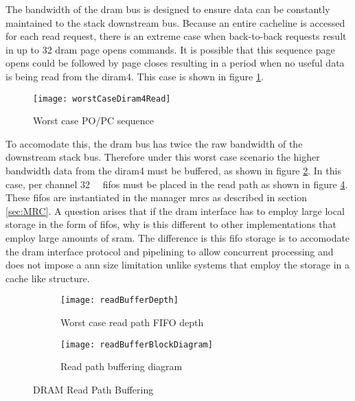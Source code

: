 The bandwidth of the \ac{dram} bus is designed to ensure data can be constantly maintained to the stack downstream bus.
Because an entire cacheline is accessed for each read request, there is an extreme case when back-to-back requests result in up to 32 \ac{dram} page opens commands.
It is possible that this sequence page opens could be followed by page closes resulting in a period when no useful data is being read from the \ac{diram4}.
This case is shown in figure \ref{fig:Worst case PO/PC sequence}.
\begin{figure}[!t]
\centering
\captionsetup{justification=centering}
\captionsetup{width=.9\linewidth}
\centerline{
\mbox{\texttt{[image: worstCaseDiram4Read]}}
}
\caption{Worst case PO/PC sequence}
\label{fig:Worst case PO/PC sequence}
\end{figure}
To accomodate this, the \ac{dram} bus has twice the raw bandwidth of the downstream stack bus. 
Therefore under this worst case scenario the higher bandwidth data from the \ac{diram4} must be buffered, as shown in figure \ref{fig:Worst case read path FIFO depth}.
In this case, per channel \SI[per-mode=symbol]{32}{\kilo\bit} \acp{fifo} must be placed in the read path as shown in figure \ref{fig:DRAM Read Path Buffering}.
These \acp{fifo} are instantiated in the manager \acp{mrc} as described in section \ref{sec:MRC}.
A question arises that if the \ac{dram} interface has to employ large local storage in the form of \acp{fifo}, why is this different to other implementations that employ large amounts of \ac{sram}.
The difference is this \ac{fifo} storage is to accomodate the \ac{dram} interface protocol and  pipelining to allow concurrent processing and does not impose a \ac{ann} size limitation unlike systems that employ the storage in a cache like structure.


\begin{figure}
\centering
\begin{subfigure}{.9\textwidth}
  \centering
  \texttt{[image: readBufferDepth]}
  \captionsetup{justification=centering, skip=0pt}
  \caption{Worst case read path FIFO depth}
  \label{fig:Worst case read path FIFO depth}
\end{subfigure}%

\bigskip

\vspace{-10pt}
\begin{subfigure}{.9\textwidth}
  \centering
  \texttt{[image: readBufferBlockDiagram]}
  \captionsetup{justification=centering, skip=6pt}
  \caption{Read path buffering diagram}
  \label{fig:Read path buffering diagram}
\end{subfigure}
\captionsetup{justification=centering, skip=16pt}
\caption{DRAM Read Path Buffering}
\label{fig:DRAM Read Path Buffering}
\end{figure}

